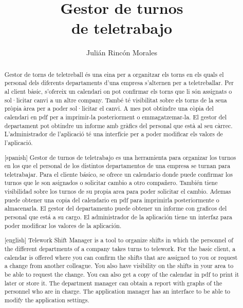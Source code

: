 \documentclass[11pt,spanish,listoffigures,listoftables]{tfgetsinf}
\title{Gestor de turnos  \\
         de teletrabajo}
\author{Julián Rincón Morales}
\begin{document}

\begin{abstract}
Gestor de torns de teletreball és una eina per a organitzar els torns en els quals el personal dels diferents departaments d'una empresa s'alternen per a teletreballar.
Per al client bàsic, s'ofereix un calendari on pot confirmar els torns que li són assignats o sol·licitar canvi a un altre company.
També té visibilitat sobre els torns de la seua pròpia àrea per a poder sol·licitar el canvi.
A mes pot obtindre una còpia del calendari en pdf per a imprimir-la posteriorment o emmagatzemar-la.
El gestor del departament pot obtindre un informe amb gràfics del personal que està al seu càrrec.
L'administrador de l'aplicació té una interfície per a poder modificar els valors de l'aplicació.
\end{abstract}
\begin{abstract}[spanish]
Gestor de turnos de teletrabajo es una herramienta para organizar los turnos en los que el personal de los distintos departamentos de una empresa se turnan para teletrabajar.
Para el cliente básico, se ofrece un calendario donde puede confirmar los turnos que le son asignados o solicitar cambio a otro compañero.
También tiene visibilidad sobre los turnos de su propia area para poder solicitar el cambio.
Ademas puede obtener una copia del calendario en pdf para imprimirla posteriormente o almacenarla.
El gestor del departamento puede obtener un informe con graficos del personal que está a su cargo.
El administrador de la aplicación tiene un interfaz para poder modificar los valores de la aplicación.
\end{abstract}
\begin{abstract}[english]
Telework Shift Manager is a tool to organize shifts in which the personnel of the different departments of a company takes turns to telework.
For the basic client, a calendar is offered where you can confirm the shifts that are assigned to you or request a change from another colleague.
You also have visibility on the shifts in your area to be able to request the change.
You can also get a copy of the calendar in pdf to print it later or store it.
The department manager can obtain a report with graphs of the personnel who are in charge.
The application manager has an interface to be able to modify the application settings.
\end{abstract}
\end{document}
